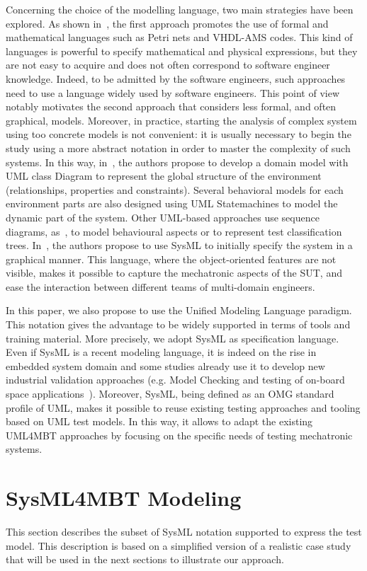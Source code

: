 \documentclass{llncs}
\begin{document}
Concerning the choice of the modelling language, two main strategies
have been explored. As shown in~\cite{Thacker}, the first approach
promotes the use of formal and mathematical languages such as Petri
nets and VHDL-AMS codes. This kind of languages is powerful to
specify mathematical and physical expressions, but they are not easy
to acquire and does not often correspond to software engineer
knowledge. Indeed, to be admitted by the software engineers, such
approaches need to use a language widely used by software
engineers. This point of view notably motivates the second approach
that considers less formal, and often graphical, models. Moreover, in
practice, starting the analysis of complex system using too concrete
models is not convenient: it is usually necessary to begin the study
using a more abstract notation in order to master the complexity of
such systems. In this way, in~\cite{SimulaEnvModeling}, the authors
propose to develop a domain model with UML class Diagram to represent
the global structure of the environment (relationships, properties and
constraints). Several behavioral models for each environment parts are
also designed using UML Statemachines to model the dynamic part of the
system. Other UML-based approaches use sequence diagrams,
as~\cite{Testbenches}, to model behavioural aspects or to represent
test classification trees. In~\cite{Evrot}, the authors propose to use
SysML to initially specify the system in a graphical manner. This
language, where the object-oriented features are not visible, makes it
possible to capture the mechatronic aspects of the SUT, and ease the
interaction between different teams of multi-domain engineers.

In this paper, we also propose to use the Unified Modeling Language
paradigm. This notation gives the advantage to be widely supported in
terms of tools and training material. More precisely, we adopt SysML as
specification language. Even if SysML is a recent modeling language,
it is indeed on the rise in embedded system domain and some studies
already use it to develop new industrial validation approaches
(e.g. Model Checking and testing of on-board space
applications~\cite{FMS99}). Moreover, SysML, being defined as an OMG 
standard profile of UML, makes it possible to reuse
existing testing approaches and tooling based on UML test models. In
this way, it allows to adapt the existing UML4MBT approaches by
focusing on the specific needs of testing mechatronic systems.  

\section{SysML4MBT Modeling}
\label{modeling}
This section describes the subset of SysML notation supported to
express the test model. This description is based on a simplified
version of a realistic case study that will be used in the next
sections to illustrate our approach.
\end{document}
